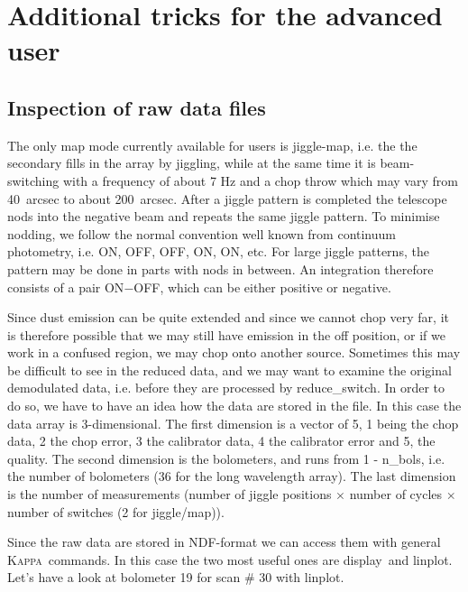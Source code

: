 \documentclass[twoside,11pt]{article}
\newcommand{\Kappa}{\xref{\textsc{Kappa}}{sun95}{}}
\newcommand{\task}[1]{\textsf{#1}}
\newcommand{\resw}{\xref{\task{reduce\_switch}}{sun216}{REDUCE_SWITCH}}
\newcommand{\display}{\xref{\task{display}}{sun95}{DISPLAY}}
\newcommand{\linplot}{\xref{\task{linplot}}{sun95}{LINPLOT}}
\newcommand{\xref}[3]{#1}
\newcommand{\xlabel}[1]{}
\begin{document}
{\newpage                       
\section{\xlabel{tricks}Additional tricks for the advanced user\label{tricks}}

\subsection{\xlabel{inspection_of_raw_data_files}Inspection of raw data files}

The only map mode currently available for users is jiggle-map, i.e. the
the secondary fills in the array by jiggling, while at the same time it is
beam-switching with a frequency of about 7 Hz and a chop throw which
may vary from 40~arcsec to about 200~arcsec. After a jiggle pattern is completed
the telescope nods into the negative beam and repeats the same jiggle
pattern.  To minimise nodding, we follow the normal convention well
known from continuum photometry, i.e. ON, OFF, OFF, ON, ON, etc. For
large jiggle patterns, the pattern may be done in parts with nods in
between. An integration therefore consists of a pair ON$-$OFF, which
can be either positive or negative.

Since dust emission can be quite extended and since we cannot chop very
far, it is therefore possible that we may still have emission in the
off position, or if we work in a confused region, we may chop onto
another source.  Sometimes this may be difficult to see in the reduced
data, and we may want to examine the original demodulated data, i.e.
before they are processed by \resw. In order to do so,
we have to have an idea how the data are stored in the file. In this
case the data array is 3-dimensional.  The first dimension is a vector
of 5, 1 being the chop data, 2 the chop error, 3 the calibrator data, 4
the calibrator error and 5, the quality. The second dimension is the
bolometers, and runs from 1 - n\_bols, i.e. the number of bolometers (36
for the long wavelength array). The last dimension is the number of
measurements (number of jiggle positions $\times$ number of cycles
$\times$ number of switches (2 for jiggle/map)).

Since the raw data are stored in NDF-format we can access them with
general \Kappa\ commands. In this case the two most useful ones are
\display\ and \linplot. Let's have a look at bolometer 19
for scan \# 30 with \linplot.

}
\end{document}
